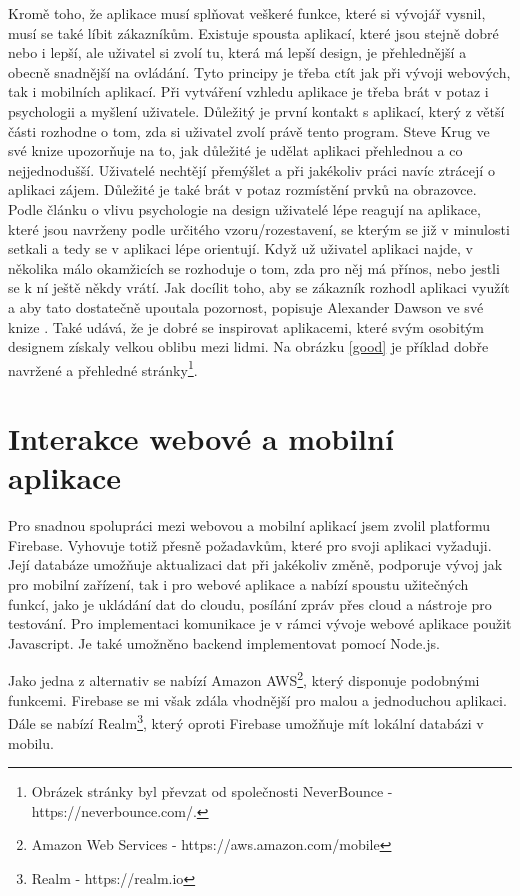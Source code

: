 Kromě toho, že aplikace musí splňovat veškeré funkce, které si vývojář vysnil, musí se také líbit zákazníkům. Existuje spousta aplikací, které jsou stejně dobré nebo i lepší, ale uživatel si zvolí tu, která má lepší design, je přehlednější a obecně snadnější na ovládání. Tyto principy je třeba ctít jak při vývoji webových, tak i mobilních aplikací. Při vytváření vzhledu aplikace je třeba brát v potaz i psychologii a myšlení uživatele. Důležitý je první kontakt s aplikací, který z větší části rozhodne o tom, zda si uživatel zvolí právě tento program. Steve Krug ve své knize \cite{Krug} upozorňuje na to, jak důležité je udělat aplikaci přehlednou a co nejjednodušší. Uživatelé nechtějí přemýšlet a při jakékoliv práci navíc ztrácejí o aplikaci zájem. Důležité je také brát v potaz rozmístění prvků na obrazovce. Podle článku o vlivu psychologie na design \cite{Than} uživatelé lépe reagují na aplikace, které jsou navrženy podle určitého vzoru/rozestavení, se kterým se již v minulosti  setkali a tedy se v aplikaci lépe orientují. Když už uživatel aplikaci najde, v několika málo okamžicích se rozhoduje o tom, zda pro něj má přínos, nebo jestli se k ní ještě někdy vrátí. Jak docílit toho, aby se zákazník rozhodl aplikaci využít a aby tato dostatečně upoutala pozornost, popisuje Alexander Dawson ve své knize \cite{Dawson}. Také udává, že je dobré se inspirovat aplikacemi, které svým osobitým designem získaly velkou oblibu mezi lidmi. Na obrázku \ref{good} je příklad dobře navržené a přehledné stránky\footnote{Obrázek stránky byl převzat od společnosti NeverBounce - https://neverbounce.com/.}.

\section{Interakce webové a mobilní aplikace}

Pro snadnou spolupráci mezi webovou a mobilní aplikací jsem zvolil platformu Firebase. Vyhovuje totiž přesně požadavkům, které pro svoji aplikaci vyžaduji. Její databáze umožňuje aktualizaci dat při jakékoliv změně, podporuje vývoj jak pro mobilní zařízení, tak i pro webové aplikace a nabízí spoustu užitečných funkcí, jako je ukládání dat do cloudu, posílání zpráv přes cloud a nástroje pro testování. Pro implementaci komunikace je v rámci vývoje webové aplikace použit Javascript. Je také umožněno backend implementovat pomocí Node.js.

Jako jedna z alternativ se nabízí Amazon AWS\footnote{Amazon Web Services - https://aws.amazon.com/mobile}, který disponuje podobnými funkcemi. Firebase se mi však zdála vhodnější pro malou a jednoduchou aplikaci. Dále se nabízí Realm\footnote{Realm - https://realm.io}, který oproti Firebase umožňuje mít lokální databázi v mobilu.

